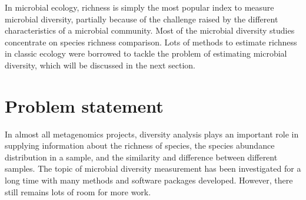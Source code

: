 In microbial ecology, richness is simply the most popular index to measure
microbial diversity, partially because of the challenge raised by the different
characteristics of a microbial community. Most of the microbial diversity studies
concentrate on species richness comparison\cite{Bohannan2003}. 
Lots of methods to estimate richness in
classic ecology were borrowed to tackle the problem of estimating microbial
diversity, which will be discussed in the next section.
\section{Problem statement}


In almost all  metagenomics projects, diversity analysis plays an important
role in supplying information about the richness of species, the species
abundance distribution in a sample, and the similarity and difference between
different samples. The topic of microbial diversity measurement has been
investigated for a long time with many methods and software packages developed.
However, there still remains lots of room for more work.


